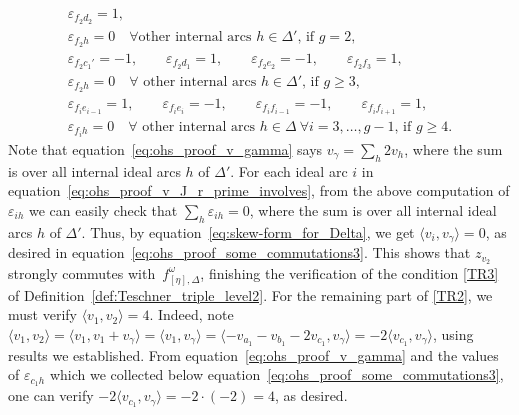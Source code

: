 \documentclass[10pt,a4paper]{amsart}
\numberwithin{equation}{section}
\theoremstyle{definition}
\begin{document}
\begin{gather*}
\varepsilon_{f_2 d_2}=1,\\
\varepsilon_{f_2 h}=0 \quad \mbox{$\forall$other internal arcs $h\in \Delta'$, if $g=2$}, \\
 \varepsilon_{f_2 c_1'}=-1,\qquad
\varepsilon_{f_2 d_1}=1,\qquad
\varepsilon_{f_2 e_2}=-1,\qquad
\varepsilon_{f_2 f_3}=1,\\
\varepsilon_{f_2 h}=0 \quad \mbox{$\forall$ other internal arcs $h\in \Delta'$, if $g\ge 3$}, \\
 \varepsilon_{f_i e_{i-1}}=1,\qquad
\varepsilon_{f_i e_i}=-1,\qquad
\varepsilon_{f_i f_{i-1}}=-1,\qquad
\varepsilon_{f_i f_{i+1}}=1,\\
\varepsilon_{f_i h}=0 \quad \mbox{$\forall$ other internal arcs $h\in \Delta$} \
 \mbox{$\forall i=3,\dots,g-1$, if $g\ge 4$}.
\end{gather*}
Note that equation~\eqref{eq:ohs_proof_v_gamma} says $v_\gamma = \sum_h 2 v_h$, where the sum is over all internal ideal arcs $h$ of $\Delta'$. For each ideal arc $i$ in equation~\eqref{eq:ohs_proof_v_J_r_prime_involves}, from the above computation of $\varepsilon_{ih}$ we can easily check that $\sum_h \varepsilon_{ih}=0$, where the sum is over all internal ideal arcs $h$ of $\Delta'$. Thus, by equation~\eqref{eq:skew-form_for_Delta}, we get $\langle v_i, v_\gamma\rangle =0$, as desired in equation~\eqref{eq:ohs_proof_some_commutations3}. This shows that $z_{v_2}$ strongly commutes with~$f^\omega_{[\eta],\Delta}$, finishing the verification of the condition \ref{TR3} of Definition~\ref{def:Teschner_triple_level2}.
For the remaining part of \ref{TR2}, we must verify $\langle v_1, v_2 \rangle=4$. Indeed, note $\langle v_1, v_2 \rangle = \langle v_1, v_1 + v_\gamma \rangle = \langle v_1, v_\gamma \rangle = \langle - v_{a_1} - v_{b_1} - 2v_{c_1}, v_\gamma\rangle = -2 \langle v_{c_1}, v_\gamma\rangle$, using results we established. From equation~\eqref{eq:ohs_proof_v_gamma} and the values of $\varepsilon_{c_1 h}$ which we collected below equation~\eqref{eq:ohs_proof_some_commutations3}, one can verify $-2 \langle v_{c_1}, v_\gamma\rangle = -2 \cdot (-2) = 4$, as desired.
\end{document}

